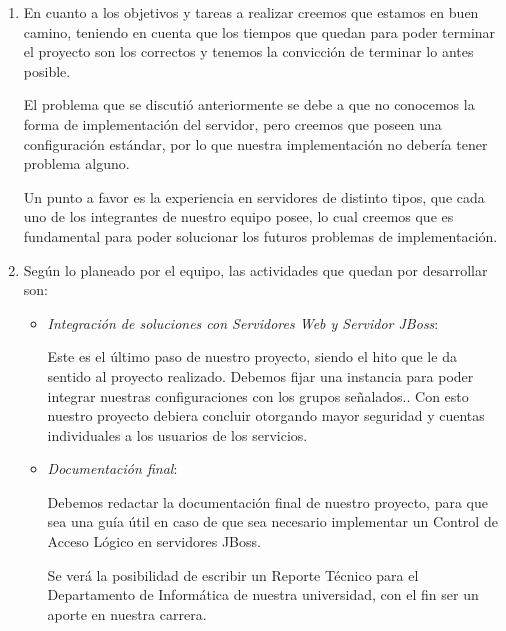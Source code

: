 
\begin{enumerate}
	\item En cuanto a los objetivos y tareas a realizar creemos que estamos en buen camino,
		teniendo en cuenta que los tiempos que quedan para poder terminar el proyecto son los correctos
		y tenemos la convicción de terminar lo antes posible.

		El problema que se discutió anteriormente se debe a que no conocemos la forma de implementación del servidor,
		pero creemos que poseen una configuración estándar, por lo que nuestra implementación no debería tener problema alguno.
		
		Un punto a favor es la experiencia en servidores de distinto tipos, que cada uno de los integrantes de nuestro equipo posee,
		lo cual creemos que es fundamental para poder solucionar los futuros problemas de implementación.


	\item Según lo planeado por el equipo, las actividades que quedan por desarrollar son:
	\begin{itemize}
		\item \emph{Integración de soluciones con Servidores Web y Servidor JBoss}:

			Este es el último paso de nuestro proyecto, siendo el hito que le da sentido al proyecto realizado.
			Debemos fijar una instancia para poder integrar nuestras configuraciones con los grupos señalados..
			Con esto nuestro proyecto debiera concluir otorgando mayor seguridad y cuentas individuales a los usuarios de los servicios.

		\item \emph{Documentación final}:

			Debemos redactar la documentación final de nuestro proyecto, para que sea una guía útil en caso de que sea necesario
			implementar un Control de Acceso Lógico en servidores JBoss.

			Se verá la posibilidad de escribir un Reporte Técnico para el Departamento de Informática de nuestra universidad,
			con el fin ser un aporte en nuestra carrera.			
	\end{itemize}
\end{enumerate}
